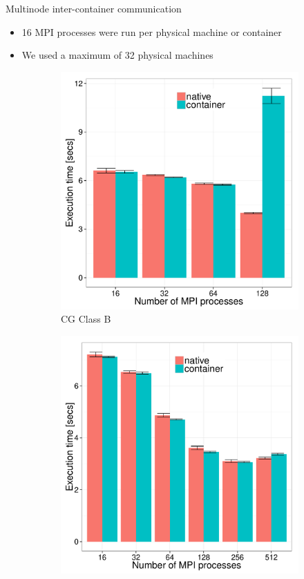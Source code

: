 \documentclass[presentation]{beamer}
\begin{document}
\begin{frame}[label=sec-3-7]{Multinode inter-container communication}
\begin{itemize}
\item 16 MPI processes were run per physical machine or container
\item We used a maximum of 32 physical machines
\end{itemize}

\begin{figure}
  \centering
  \begin{subfigure}[b]{0.42\textwidth}
    \includegraphics[scale=0.25,angle=0]{figures/veth_overhead-tso-cgB.pdf}
    \caption{CG Class B}
  \end{subfigure}
  \begin{subfigure}[b]{0.42\textwidth}
    \includegraphics[scale=0.25,angle=0]{figures/veth_overhead-tso-ftB.pdf}

\end{subfigure}
\end{figure}
\end{frame}
\end{document}
